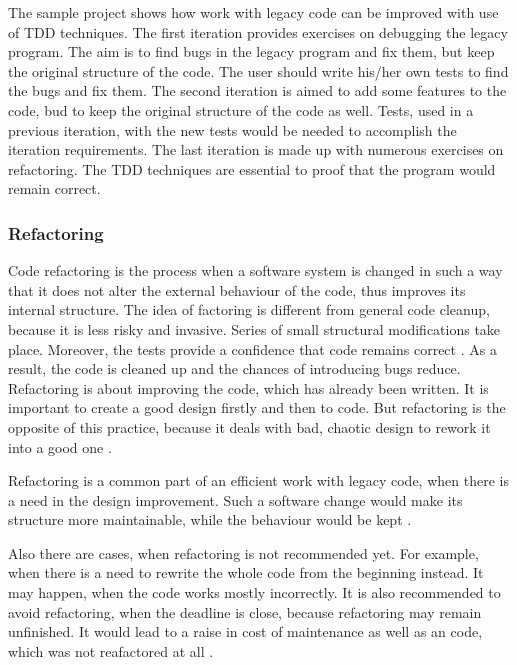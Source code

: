 The sample project shows how work with legacy code can be improved with use of TDD techniques. The first iteration provides exercises on debugging the legacy program. The aim is to find bugs in the legacy program and fix them, but keep the original structure of the code. The user should write his/her own tests to find the bugs and fix them. The second iteration is aimed to add some features to the code, bud to keep the original structure of the code as well. Tests, used in a previous iteration, with the new tests would be needed to accomplish the iteration requirements. The last iteration is made up with numerous exercises on refactoring. The TDD techniques are essential to proof that the program would remain correct.

\subsubsection{Refactoring}

Code refactoring is the process when a software system is changed in such a way that it does not alter the external behaviour of the code, thus improves its internal structure. The idea of factoring is different from general code cleanup, because it is less risky and invasive. Series of small structural modifications take place. Moreover, the tests provide a confidence that code remains correct \cite{lc_effectively}. As a result, the code is cleaned up and the chances of introducing bugs reduce. Refactoring is about improving the code, which has already been written. It is important to create a good design firstly and then to code. But refactoring is the opposite of this practice, because it deals with bad, chaotic design to rework it into a good one \cite[Preface]{ref_ec}.

Refactoring is a common part of an efficient work with legacy code, when there is a need in the design improvement. Such a software change would make its structure more maintainable, while the behaviour would be kept \cite{lc_effectively}.

Also there are cases, when refactoring is not recommended yet. For example, when there is a need to rewrite the whole code from the beginning instead. It may happen, when the code works mostly incorrectly. It is also recommended to avoid refactoring, when the deadline is close, because refactoring may remain unfinished. It would lead to a raise in cost of maintenance as well as an code, which was not reafactored at all \cite[Preface]{ref_debt}.


